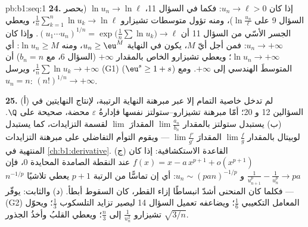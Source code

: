 \begin{solution}{pb:b1:seq:1}
\textbf{24.} إذا كان $u_n \to \ell > 0$: فكما في السؤال 11، $\ln u_n
\to \ln\ell$ (بحصر السؤال 9 على $\ln\frac{u_n}{\ell}$)، ومنه
تؤول متوسطات تشيزارو $\frac1n\sum_{k=1}^n \ln u_k \to \ln\ell$،
ويعطي الجسر الأسّي من السؤال 11 أن $(u_1\cdots
u_n)^{1/n} = \exp\bigl(\frac1n\sum\ln u_k\bigr) \to \ell$. وإذا كان
$u_n \to +\infty$: فمن أجل أيّ $M$، يكون في النهاية $u_n \geq \eu^M$، ومنه
$\ln u_n \geq M$: أي $\ln u_n \to +\infty$؛ ويعطي تشيزارو الخاص بالمقدار $+\infty$
(السؤال 6، مع $b_n = n$) أن $\frac1n\sum \ln u_k \to
+\infty$، ويرسل (G1) ($\eu^s \geq 1 + s$) المتوسطَ الهندسي
إلى $+\infty$. ومع $u_n = n$: $(n!)^{1/n} \to +\infty$.

\textbf{25.} (أ) لم تدخل خاصية التمام إلا عبر مبرهنة
النهاية الرتيبة، لإنتاج النهايتين في السؤالين 12 و 20؛
أمّا مبرهنة تشيزارو--ستولتز نفسها فإدارةُ
$\varepsilon$ محضة، صحيحة على $\Q$. (ب) يستبدل ستولتز
بالمقدار $\lim \frac{a_n}{b_n}$ المقدارَ $\lim$ لقسمة التزايدات،
كما يستبدل لوبيتال بالمقدار $\lim\frac fg$ المقدارَ
$\lim\frac{f'}{g'}$ --- ويقوم التوأم التفاضلي على مبرهنة
التزايدات المنتهية في \cref{ch:b1:derivative}. (ج) القاعدة الاستكشافية: إذا كان
$f(x) = x - a\,x^{p+1} + o(x^{p+1})$ عند النقطة الصامدة المحايدة
$0$، فإن $\frac{1}{u_{n+1}^p} - \frac{1}{u_n^p} \to pa$ و
$u_n \sim (pan)^{-1/p}$: أي إن تماسًّا من الرتبة $p + 1$ يعطي تلاشيًا
$n^{-1/p}$ --- فكلما كان المنحنى أشدّ انبساطًا إزاء القطر، كان
السقوط أبطأ. (د) والثابت: يوفّر (G2) المعامل
التكعيبي $\frac16$؛ ويضاعفه تعميل السؤال 14
ليصير تزايد التلسكوب $\frac13$؛ ويحوّل تشيزارو
$\frac{1}{u_n^2}$ إلى $\frac n3$؛ ويعطي القلبُ وأخذُ الجذور
$\sqrt{3/n}$.
\end{solution}
